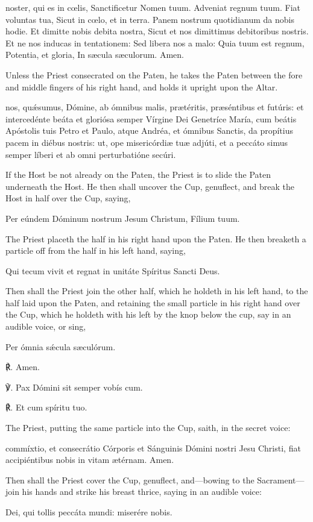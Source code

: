  noster, qui es in c{\oe}lis, Sanctificetur Nomen tuum. Adveniat regnum tuum. Fiat voluntas tua, Sicut in c{\oe}lo, et in terra. Panem nostrum quotidianum da nobis hodie. Et dimitte nobis debita nostra, Sicut et nos dimittimus debitoribus nostris. Et ne nos inducas in tentationem: Sed libera nos a malo: Quia tuum est regnum, Potentia, et gloria, In sæcula sæculorum. Amen.
\begin{rubric}
    Unless the Priest consecrated on the Paten, he takes the Paten between the fore and middle fingers of his right hand, and holds it upright upon the Altar.
\end{rubric}
 nos, quǽsumus, Dómine, ab ómnibus malis, prætéritis, præséntibus et futúris: et intercedénte beáta et gloriósa semper Vírgine Dei Genetríce María, cum beátis Apóstolis tuis Petro et Paulo, atque Andréa, et ómnibus Sanctis, da propítius pacem in diébus nostris: ut, ope misericórdiæ tuæ adjúti, et a peccáto simus semper líberi et ab omni perturbatióne secúri.
\begin{rubric}
    If the Host be not already on the Paten, the Priest is to slide the Paten underneath the Host. He then shall uncover the Cup, genuflect, and break the Host in half over the Cup, saying,
\end{rubric}\par\noindent
Per eúndem Dóminum nostrum Jesum Christum, Fílium tuum.
\begin{rubric}
    The Priest placeth the half in his right hand upon the Paten. He then breaketh a particle off from the half in his left hand, saying,
\end{rubric}\par\noindent
Qui tecum vivit et regnat in unitáte Spíritus Sancti Deus.
\begin{rubric}
    Then shall the Priest join the other half, which he holdeth in his left hand, to the half laid upon the Paten, and retaining the small particle in his right hand over the Cup, which he holdeth with his left by the knop below the cup, say in an audible voice, or sing,
\end{rubric}\par\noindent
Per ómnia sǽcula sæculórum.\par
℟. Amen.\par
℣. Pax {} Dómini sit {} semper vobís {} cum.\par
℟. Et cum spíritu tuo.
\begin{rubric}
    The Priest, putting the same particle into the Cup, saith, in the secret voice:
\end{rubric}
 commíxtio, et consecrátio Córporis et Sánguinis Dómini nostri Jesu Christi, fiat accipiéntibus nobis in vitam ætérnam. Amen.
\begin{rubric}
    Then shall the Priest cover the Cup, genuflect, and---bowing to the Sacrament---join his hands and strike his breast thrice, saying in an audible voice:
\end{rubric}
 Dei, qui tollis peccáta mundi: miserére nobis.

